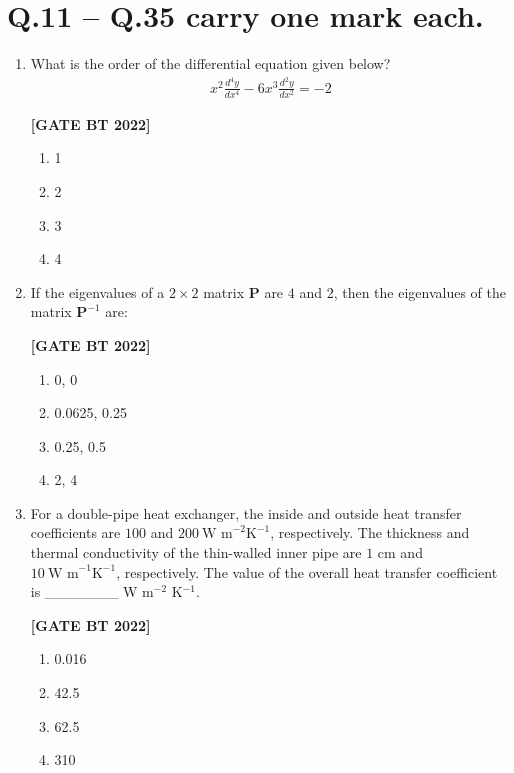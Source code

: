 \documentclass[12pt]{article}
\begin{document}
\section*{Q.11 -- Q.35 carry one mark each.}

\begin{enumerate}[leftmargin=2.5em, label=\textbf{Q.\arabic*}., itemsep=2em, resume]

\item What is the order of the differential equation given below?
\begin{align*}
x^2 \frac{d^4 y}{dx^4} - 6x^3 \frac{d^2 y}{dx^2} = -2
\end{align*}

\noindent \textbf{[GATE BT 2022]}
\begin{multicols}{2}
\begin{enumerate}
    \item 1
    \item 2
    \item 3
    \item 4
\end{enumerate}
\end{multicols}

\item If the eigenvalues of a $2\times2$ matrix $\mathbf{P}$ are $4$ and $2$, then the eigenvalues of the matrix $\mathbf{P}^{-1}$ are:

\noindent \textbf{[GATE BT 2022]}
\begin{multicols}{2}
\begin{enumerate}
    \item 0, 0
    \item 0.0625, 0.25
    \item 0.25, 0.5
    \item 2, 4
\end{enumerate}
\end{multicols}

\item For a double-pipe heat exchanger, the inside and outside heat transfer coefficients are $100$ and $200~\text{W m}^{-2}\text{K}^{-1}$, respectively. The thickness and thermal conductivity of the thin-walled inner pipe are $1$ cm and $10~\text{W m}^{-1}\text{K}^{-1}$, respectively. The value of the overall heat transfer coefficient is \_\_\_\_\_\_\_ W m$^{-2}$ K$^{-1}$.

\noindent \textbf{[GATE BT 2022]}
\begin{multicols}{2}
\begin{enumerate}
    \item 0.016
    \item 42.5
    \item 62.5
    \item 310
\end{enumerate}
\end{multicols}


\end{enumerate}
\end{document}
